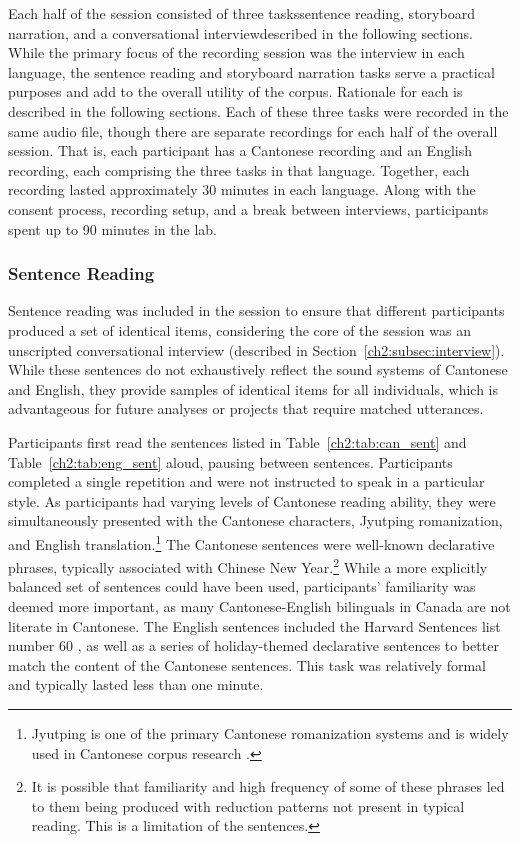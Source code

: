 Each half of the session consisted of three tasks\textemdash sentence reading, storyboard narration, and a conversational interview\textemdash described in the following sections. While the primary focus of the recording session was the interview in each language, the sentence reading and storyboard narration tasks serve a practical purposes and add to the overall utility of the corpus. Rationale for each is described in the following sections. Each of these three tasks were recorded in the same audio file, though there are separate recordings for each half of the overall session. That is, each participant has a Cantonese recording and an English recording, each comprising the three tasks in that language. Together, each recording lasted approximately 30 minutes in each language. Along with the consent process, recording setup, and a break between interviews, participants spent up to 90 minutes in the lab. 

\subsubsection{Sentence Reading}\label{ch2:subsec:sentences}
Sentence reading was included in the session to ensure that different participants produced a set of identical items, considering the core of the session was an unscripted conversational interview (described in Section~\ref{ch2:subsec:interview}). While these sentences do not exhaustively reflect the sound systems of Cantonese and English, they provide samples of identical items for all individuals, which is advantageous for future analyses or projects that require matched utterances.

Participants first read the sentences listed in Table~\ref{ch2:tab:can_sent} and Table~\ref{ch2:tab:eng_sent} aloud, pausing between sentences. Participants completed a single repetition and were not instructed to speak in a particular style. As participants had varying levels of Cantonese reading ability, they were simultaneously presented with the Cantonese characters, Jyutping romanization, and English translation.\footnote{Jyutping is one of the primary Cantonese romanization systems \citep{matthews_2013_cantonese} and is widely used in Cantonese corpus research \citep{nagy_2011_hlvc, tse_2019_heritage}.} The Cantonese sentences were well-known declarative phrases, typically associated with Chinese New Year.\footnote{It is possible that familiarity and high frequency of some of these phrases led to them being produced with reduction patterns not present in typical reading. This is a limitation of the sentences.} While a more explicitly balanced set of sentences could have been used, participants' familiarity was deemed more important, as many Cantonese-English bilinguals in Canada are not literate in Cantonese. The English sentences included the Harvard Sentences list number 60 \citep{ieee_1969_sentences}, as well as a series of holiday-themed declarative sentences to better match the content of the Cantonese sentences. This task was relatively formal and typically lasted less than one minute. 

